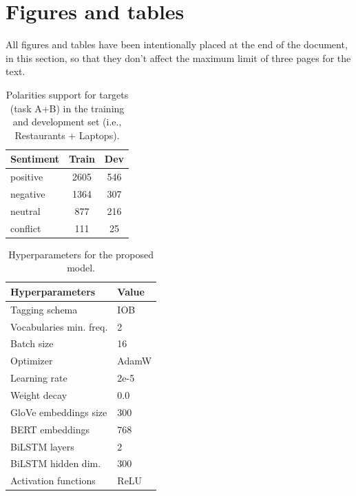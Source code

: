 \documentclass[11pt,a4paper]{article}
\begin{document}
	\clearpage
	\section{Figures and tables}
	All figures and tables have been intentionally placed at the end of the
	document, in this section, so that they don't affect the maximum limit of three
	pages for the text.
	
	\begin{table}[H]
		\centering
		\begin{tabular}{@{}lcc@{}}
			\toprule
			\textbf{Sentiment} & Train & Dev \\ \midrule
			positive           & 2605  & 546 \\
			negative           & 1364  & 307 \\
			neutral            & 877   & 216 \\
			conflict           & 111   & 25  \\ \bottomrule
		\end{tabular}
		\caption{Polarities support for targets (task A+B) in the training and
			development set (i.e., Restaurants + Laptops).}
		\label{tab:ab_polarities_support}
	\end{table}

	\begin{table}[H]
		\centering
		\begin{tabular}{@{}ll@{}}
			\toprule
			\textbf{Hyperparameters}                  & Value \\ \midrule
			Tagging schema                            & IOB   \\
			Vocabularies min. freq.                   & 2     \\
			Batch size                                & 16    \\
			Optimizer                                 & AdamW \\
			Learning rate                             & 2e-5  \\
			Weight decay                              & 0.0   \\
			GloVe embeddings size                     & 300   \\
			BERT embeddings                           & 768   \\
			BiLSTM layers                             & 2     \\
			BiLSTM hidden dim.                        & 300   \\
			Activation functions                      & ReLU  \\ \bottomrule
		\end{tabular}
		\caption{Hyperparameters for the proposed model.}
		\label{tab:hyperparams}
	\end{table}
	
\end{document}

